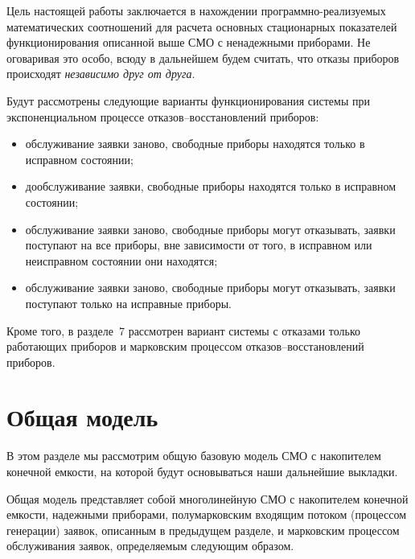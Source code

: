 \begin{multicols}{2}
Цель настоящей работы заключается в на\-хож\-де\-нии программно-реализуемых
математических соотношений для расчета основных стационарных показателей
функционирования описанной выше СМО с ненадежными приборами.
Не оговаривая это особо, всюду в дальнейшем будем считать, что отказы
приборов происходят {\it независимо друг от друга}.

Будут рассмотрены следующие варианты функционирования системы при
экспоненциальном процессе отказов--восстановлений приборов:
\begin{itemize}
\item  обслуживание заявки заново, свободные приборы находятся только в
исправном состоянии;
\item дообслуживание заявки, свободные приборы находятся только в
исправном состоянии;
\item обслуживание заявки заново, свободные приборы могут отказывать,
заявки поступают на все приборы, вне зависимости от того, в исправном
или неисправном состоянии они находятся;
\item  обслуживание заявки заново, свободные приборы могут отказывать,
заявки поступают только на исправные приборы.
\end{itemize}

Кроме того, в разделе~7 рассмотрен вариант сис\-те\-мы с отказами только
работающих приборов и марковским процессом отказов--восстановлений
приборов.

\section{Общая модель}

В этом разделе мы рассмотрим общую базовую модель СМО с накопителем
конечной емкости, на которой будут основываться наши дальнейшие
выкладки.

Общая модель представляет собой многолинейную СМО с накопителем конечной
емкости, надежными приборами, полумарковским входящим потоком
(процессом генерации) заявок, описанным в предыдущем разделе, и марковским
процессом обслуживания заявок, определяемым следующим образом.


\end{multicols}
